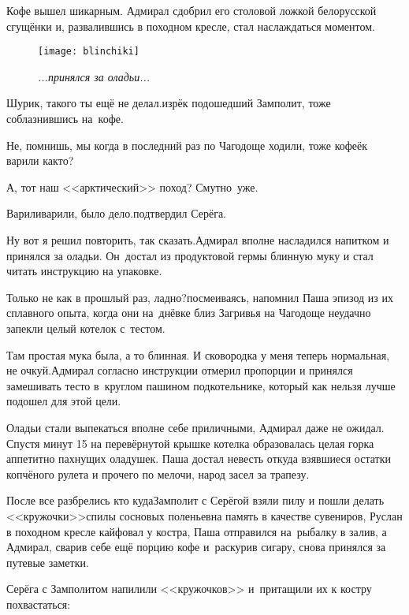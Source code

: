 Кофе вышел шикарным. Адмирал сдобрил его столовой ложкой белорусской сгущёнки и, развалившись в походном кресле, стал наслаждаться моментом.

\newpage

\begin{wrapfigure}[20]{r}{0.58\textwidth}
	\centering
	\texttt{[image: blinchiki]}
	\caption{\small\textit{...принялся за оладьи...}}
\end{wrapfigure}
\diagdash Шурик, такого ты ещё не делал.\mdash изрёк подошедший Замполит, тоже соблазнившись на~кофе.

\diagdash Не, помнишь, мы когда в последний раз по Чагодоще ходили, тоже кофеёк варили как\sdash то?

\diagdash А, тот наш <<арктический>> поход? Смутно~уже.

\diagdash Варили\sdash варили, было дело.\mdash подтвердил Серёга.

\diagdash Ну вот я решил повторить, так сказать.\mdash Адмирал вполне насладился напитком и принялся за оладьи. Он~достал из продуктовой гермы блинную муку и стал читать инструкцию на упаковке.

\diagdash Только не как в прошлый раз, ладно?\mdash посмеиваясь, напомнил Паша эпизод из их сплавного опыта, когда они на~днёвке близ Загривья на Чагодоще неудачно запекли целый котелок с~тестом.

\diagdash Там простая мука была, а то блинная. И сковородка у меня теперь нормальная, не очкуй.\mdash Адмирал согласно инструкции отмерил пропорции и принялся замешивать тесто в~круглом пашином подкотельнике, который как нельзя лучше подошел для этой цели.

Оладьи стали выпекаться вполне себе приличными, Адмирал даже не ожидал. Спустя минут 15 на перевёрнутой крышке котелка образовалась целая горка аппетитно пахнущих оладушек. Паша достал невесть откуда взявшиеся остатки копчёного рулета и прочего по мелочи, народ засел за трапезу.

После все разбрелись кто куда\mdash Замполит с Серёгой взяли пилу и пошли делать <<кружочки>>\mdash спилы сосновых поленьев\mdash на память в качестве сувениров, Руслан в походном кресле кайфовал у костра, Паша отправился на~рыбалку в залив, а Адмирал, сварив себе ещё порцию кофе и~раскурив сигару, снова принялся за путевые заметки.

Серёга с Замполитом напилили <<кружочков>> и~притащили их к костру похвастаться:

